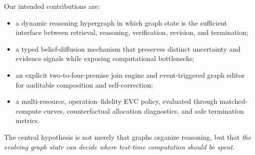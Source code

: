 Our intended contributions are:
\begin{itemize}[leftmargin=*,nosep]
  \item a dynamic reasoning hypergraph in which graph state is the sufficient interface between retrieval, reasoning, verification, revision, and termination;
  \item a typed belief-diffusion mechanism that preserves distinct uncertainty and evidence signals while exposing computational bottlenecks;
  \item an explicit two-to-four-premise join engine and event-triggered graph editor for auditable composition and self-correction;
  \item a multi-resource, operation--fidelity EVC policy, evaluated through matched-compute curves, counterfactual allocation diagnostics, and safe termination metrics.
\end{itemize}
The central hypothesis is not merely that graphs organize reasoning, but that \emph{the evolving graph state can decide where test-time computation should be spent}.
